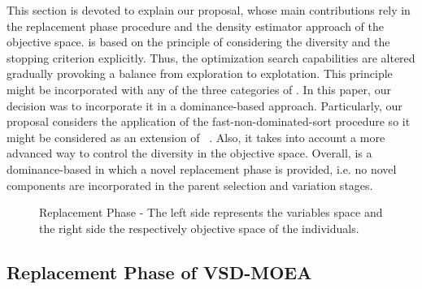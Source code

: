 This section is devoted to explain our proposal, whose main contributions rely in the replacement phase procedure and the density estimator approach of the objective space.
%
\VSDMOEA{} is based on the principle of considering the diversity and the stopping criterion explicitly.
%
Thus, the optimization search capabilities are altered gradually provoking a balance from exploration to explotation.
%
This principle might be incorporated with any of the three categories of \MOEAS{}.
%
In this paper, our decision was to incorporate it in a dominance-based approach.
%
Particularly, our proposal considers the application of the fast-non-dominated-sort procedure so it might be considered as an extension
of \NSGAII{}~\cite{Joel:NSGAII}.
%
Also, it takes into account a more advanced way to control the diversity in the objective space.
%
%
%
Overall, \VSDMOEA{} is a dominance-based \MOEA{} in which a novel replacement phase is provided,
i.e. no novel components are incorporated in the parent selection and variation stages.
\begin{figure}[t]
\centering

\caption{Replacement Phase - The left side represents the variables space and the right side the respectively objective space of the individuals.  }
\label{fig:Hypersphere}
\end{figure}


\subsection{Replacement Phase of VSD-MOEA}


